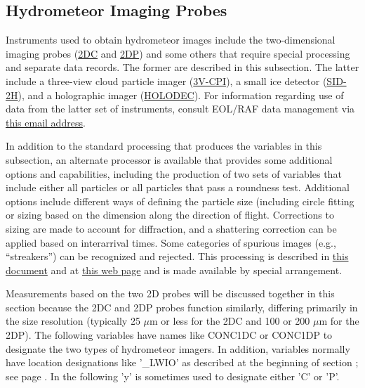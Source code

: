 \subsection{Hydrometeor Imaging Probes\label{subsec:Hydrometeor-Imaging-Probes}}

Instruments used to obtain hydrometeor images include the two-dimensional
imaging probes (\href{https://www.eol.ucar.edu/instruments/two-dimensional-optical-array-cloud-probe}{2DC}
and \href{https://www.eol.ucar.edu/instruments/two-dimensional-optical-array-precipitation-probe}{2DP})
and some others that require special processing and separate data
records. The former are described in this subsection. The latter include
a three-view cloud particle imager (\href{https://www.eol.ucar.edu/instruments/three-view-cloud-particle-imager}{3V-CPI}),
a small ice detector (\href{https://www.eol.ucar.edu/instruments/small-ice-detector-version-2-hiaper}{SID-2H}),
and a holographic imager (\href{https://www.eol.ucar.edu/instruments/holographic-detector-clouds}{HOLODEC}).
For information regarding use of data from the latter set of instruments,
consult EOL/RAF data management via \href{mailto:mailto:raf-dm@eol.ucar.edu}{this email address}.

In addition to the standard processing that produces the variables
in this subsection, an alternate processor is available that provides
some additional options and capabilities, including the production
of two sets of variables that include either all particles or all
particles that pass a roundness test. Additional options include different
ways of defining the particle size (including circle fitting or sizing
based on the dimension along the direction of flight. Corrections
to sizing are made to account for diffraction, and a shattering correction
can be applied based on interarrival times. Some categories of spurious
images (e.g., ``streakers'') can be recognized and rejected. This
processing is described in \href{https://drive.google.com/open?id=0B1kIUH45ca5AOFpZUGxGVUg3VWc}{this document}
and at \href{https://www.eol.ucar.edu/software/process2d}{this web page}
and is made available by special arrangement. 

Measurements based on the two 2D probes will be discussed together
in this section because the 2DC and 2DP probes function similarly,
differing primarily in the size resolution (typically 25 $\mu$m or
less for the 2DC and 100 or 200 $\mu$m for the 2DP). The following
variables have names like CONC1DC or CONC1DP to designate the two
types of hydrometeor imagers. In addition, variables normally have
location designations like '\_LWIO' as described at the beginning
of section ; see page \pageref{VariableNames1DProbes}.
In the following 'y' is sometimes used to designate either 'C' or
'P'.

